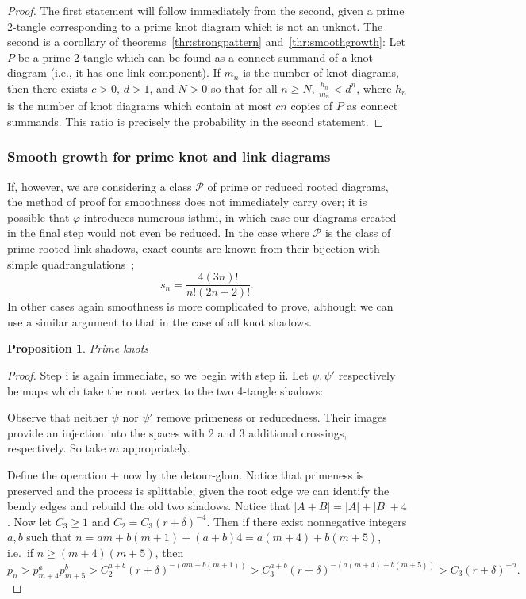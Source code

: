 \documentclass[amsmath,longbibliography,secnumarabic,floatfix,amssymb,nofootinbib,nobibnotes,letterpaper,11pt,tightenlines,notitlepage,showkeys,showlabels]{amsart}%
\newcommand{\PrimeShad}{\mathscr{P}}
\newtheorem{proposition}[theorem]{Proposition}
\theoremstyle{definition}
\begin{document}
\begin{proof}
  The first statement will follow immediately from the second, given a
  prime 2-tangle corresponding to a prime knot diagram which is not an
  unknot. The second is a corollary of
  theorems~\ref{thr:strongpattern} and~\ref{thr:smoothgrowth}: Let $P$
  be a prime 2-tangle which can be found as a connect summand of a knot
  diagram (i.e., it has one link component). If $m_n$ is the number of
  knot diagrams, then there exists $c > 0$, $d > 1$, and $N > 0$ so
  that for all $n \ge N$, $\frac {h_n}{m_n} < d^n$, where $h_n$ is the
  number of knot diagrams which contain at most $cn$ copies of $P$ as
  connect summands. This ratio is precisely the probability in the
  second statement.
\end{proof}

\subsubsection{Smooth growth for prime knot and link diagrams}
\label{sec:smoothprime}

If, however, we are considering a class $\PrimeShad$ of prime or
reduced rooted diagrams, the method of proof for smoothness does not
immediately carry over; it is possible that $\varphi$ introduces
numerous isthmi, in which case our diagrams created in the final step
would not even be reduced. In the case where $\PrimeShad$ is the class
of prime rooted link shadows, exact counts are known from their
bijection with simple quadrangulations~\cite{AlbenqueSQT};
\[ s_n = \frac{4(3n)!}{n!(2n + 2)!}.\]
In other cases again smoothness is more complicated to prove, although we can use a similar argument
to that in the case of all knot shadows.

\begin{proposition}
  Prime knots
\end{proposition}

\begin{proof}
  Step i is again immediate, so we begin with step ii. Let $\psi, \psi'$ respectively be maps which
  take the root vertex to the two 4-tangle shadows:

  Observe that neither $\psi$ nor $\psi'$ remove primeness or reducedness. Their images provide an
  injection into the spaces with 2 and 3 additional crossings, respectively. So take $m$
  appropriately.

  Define the operation $+$ now by the detour-glom. Notice that primeness is preserved and the
  process is splittable; given the root edge we can identify the bendy edges and rebuild the old two
  shadows. Notice that $|A + B| = |A| + |B| + 4$. Now let $C_3 \ge 1$ and $C_2 = C_3(r +
  \delta)^{-4}$. Then if there exist nonnegative integers $a, b$ such that $n = am + b(m+1) + (a+b)4
  = a(m + 4) + b(m+5)$, i.e.\ if $n \ge (m+4)(m+5)$, then
  \[ p_n > p_{m+4}^ap_{m+5}^b > C_2^{a+b}(r+\delta)^{-(am+b(m+1))} > C_3^{a+b}(r+\delta)^{-(a(m+4) + b(m+5))}
  > C_3(r+\delta)^{-n}.\]
\end{proof}
\end{document}
